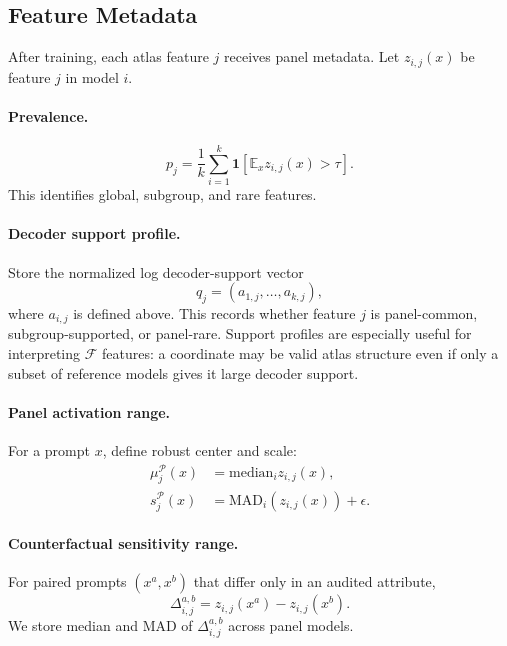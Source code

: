 \documentclass[11pt]{article}
\newcommand{\panel}{\mathcal{P}}
\newcommand{\mad}{\mathrm{MAD}}
\newcommand{\E}{\mathbb{E}}
\newcommand{\flex}{\mathcal{F}}
\begin{document}
\subsection{Feature Metadata}

After training, each atlas feature $j$ receives panel metadata. Let $z_{i,j}(x)$ be feature $j$ in model $i$.

\paragraph{Prevalence.}
\begin{equation}
    p_j = \frac{1}{k}\sum_{i=1}^{k}\mathbf{1}\left[\E_x z_{i,j}(x) > \tau\right].
\end{equation}
This identifies global, subgroup, and rare features.

\paragraph{Decoder support profile.}
Store the normalized log decoder-support vector
\begin{equation}
    q_j=(a_{1,j},\ldots,a_{k,j}),
\end{equation}
where $a_{i,j}$ is defined above. This records whether feature $j$ is panel-common, subgroup-supported, or panel-rare. Support profiles are especially useful for interpreting $\flex$ features: a coordinate may be valid atlas structure even if only a subset of reference models gives it large decoder support.

\paragraph{Panel activation range.}
For a prompt $x$, define robust center and scale:
\begin{equation}
    \begin{aligned}
    \mu_j^{\panel}(x) &= \mathrm{median}_{i} z_{i,j}(x),\\
    s_j^{\panel}(x) &= \mad_i(z_{i,j}(x))+\epsilon.
    \end{aligned}
\end{equation}

\paragraph{Counterfactual sensitivity range.}
For paired prompts $(x^a,x^b)$ that differ only in an audited attribute,
\begin{equation}
    \Delta_{i,j}^{a,b}=z_{i,j}(x^a)-z_{i,j}(x^b).
\end{equation}
We store median and MAD of $\Delta_{i,j}^{a,b}$ across panel models.
\end{document}
